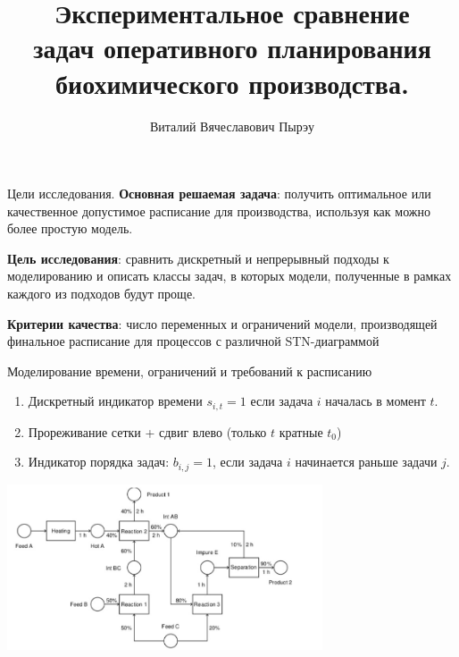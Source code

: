 \documentclass{beamer}
\title[\hbox to 56mm{Задачи планирования}]{	Экспериментальное сравнение \\ задач оперативного планирования биохимического производства.}
\author[В.\,В. Пырэу]{Виталий Вячеславович Пырэу}
\institute{Московский физико-технический институт}
\date{\footnotesize
\par\smallskip\emph{Курс:} Автоматизация научных исследований\par (практика, В.\,В.~Стрижов)/Группа Б05-821
\par\smallskip\emph{Эксперт:} С.\,А.~Тренин
\par\bigskip\small 2021}
\begin{document}
\begin{frame}
\thispagestyle{empty}
\maketitle
\end{frame}

\begin{frame}{Цели исследования.}
\textbf{Основная решаемая задача}: получить оптимальное или качественное допустимое расписание для производства, используя как можно более простую модель.


\textbf{Цель исследования}: сравнить дискретный и непрерывный подходы к моделированию и описать классы задач, в которых модели, полученные в рамках каждого из подходов будут проще.

\textbf{Критерии качества}: число переменных и ограничений модели, производящей финальное расписание для процессов с различной STN-диаграммой
\end{frame}
\begin{frame}{Моделирование времени, ограничений и требований к расписанию}
\begin{enumerate}
	\item Дискретный индикатор времени $s_{i, t} = 1$ если задача $i$ началась в момент $t$.
	\item Прореживание сетки + сдвиг влево (только $t$ кратные $t_0$)
	\item Индикатор порядка задач: $b_{i, j} = 1$, если задача $i$ начинается раньше задачи $j$.
\end{enumerate}

\begin{center}
\includegraphics[width=0.7\textwidth]{Пример процесса}
\end{center}

\end{frame}
\end{document}
